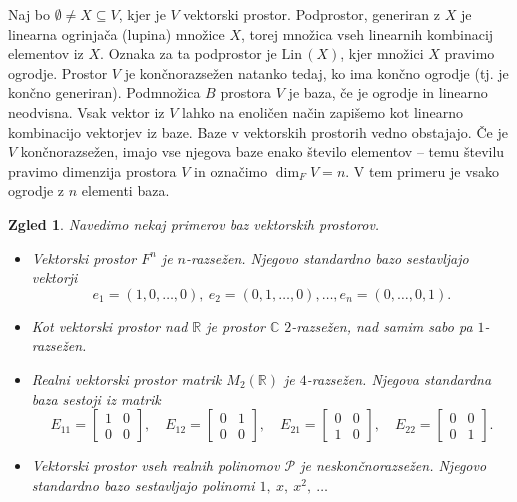 \documentclass[10pt, a4paper]{article}
\newtheorem{zgled}{Zgled}[section]
\newcommand{\R}{\mathbb {R}}
\newcommand{\C}{\mathbb {C}}
\begin{document}
Naj bo $\emptyset \neq X \subseteq V$, kjer je $V$ vektorski prostor.
Podprostor, generiran z $X$ je linearna ogrinjača (lupina)
množice $X$, torej množica vseh linearnih kombinacij elementov iz $X$.
Oznaka za ta podprostor je $\mathrm{Lin}\, (X)$, kjer množici $X$ pravimo ogrodje.
Prostor $V$ je končnorazsežen natanko tedaj, ko ima končno ogrodje (tj. je končno generiran).
Podmnožica $B$ prostora $V$ je baza, če je ogrodje in linearno neodvisna.
Vsak vektor iz $V$ lahko na enoličen način zapišemo kot linearno kombinacijo vektorjev iz baze.
Baze v vektorskih prostorih vedno obstajajo.
Če je $V$ končnorazsežen, imajo vse njegova baze enako število elementov -- temu številu pravimo dimenzija prostora $V$
in označimo $\dim_F V = n$. V tem primeru je vsako ogrodje z $n$ elementi baza.

\begin{zgled}
  Navedimo nekaj primerov baz vektorskih prostorov.
  \begin{itemize}
    \item Vektorski prostor $F^n$ je $n$-razsežen. Njegovo standardno bazo sestavljajo vektorji
    $$e_1 = (1, 0, \dots, 0),\ e_2 = (0, 1, \dots, 0), \dots, e_n = (0, \dots, 0, 1).$$
    \item Kot vektorski prostor nad $\R$ je prostor $\C$ $2$-razsežen, nad samim sabo pa $1$-razsežen.
    \item Realni vektorski prostor matrik $M_2 (\R)$ je $4$-razsežen. Njegova standardna baza sestoji iz matrik
    $$E_{11} = \begin{bmatrix}
      1 & 0\\
      0 & 0
    \end{bmatrix}, \quad E_{12} = \begin{bmatrix}
      0 & 1\\
      0 & 0
    \end{bmatrix}, \quad E_{21} = \begin{bmatrix}
      0 & 0\\
      1 & 0
    \end{bmatrix}, \quad E_{22} = \begin{bmatrix}
      0 & 0\\
      0 & 1
    \end{bmatrix}.$$
    \item Vektorski prostor vseh realnih polinomov $\mathcal{P}$ je neskončnorazsežen. Njegovo standardno bazo sestavljajo polinomi $1,\ x,\ x^2,\ \dots$
  \end{itemize}
\end{zgled}
\end{document}
